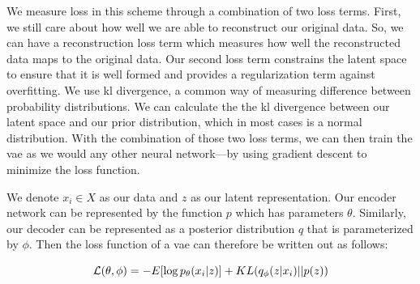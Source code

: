 We measure loss in this scheme through a combination of two loss terms.
First, we still care about how well we are able to reconstruct our original data.
So, we can have a reconstruction loss term which measures how well the reconstructed data maps to the original data.
Our second loss term constrains the latent space to ensure that it is well formed and provides a regularization term against overfitting.
We use \gls{kl} divergence, a common way of measuring difference between probability distributions.
We can calculate the the \gls{kl} divergence between our latent space and our prior distribution, which in most cases is a normal distribution.
With the combination of those two loss terms, we can then train the \gls{vae} as we would any other neural network---by using gradient descent to minimize the loss function.

We denote $x_i \in X$ as our data and $z$ as our latent representation.
Our encoder network can be represented by the function $p$ which has parameters $\theta$.
Similarly, our decoder can be represented as a posterior distribution $q$ that is parameterized by $\phi$.
Then the loss function of a \gls{vae} can therefore be written out as follows:

\begin{equation}\label{eqn:vae-loss}
\mathcal{L}(\theta, \phi) = - E[\log p_{\theta}(x_i | z)] + KL(q_{\phi}(z | x_i) || p(z)) \\
\end{equation}

